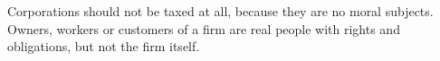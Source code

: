 Corporations should not be taxed at all, because they are no moral subjects.
Owners, workers or customers of a firm are real people with rights and obligations, but not the firm itself.
